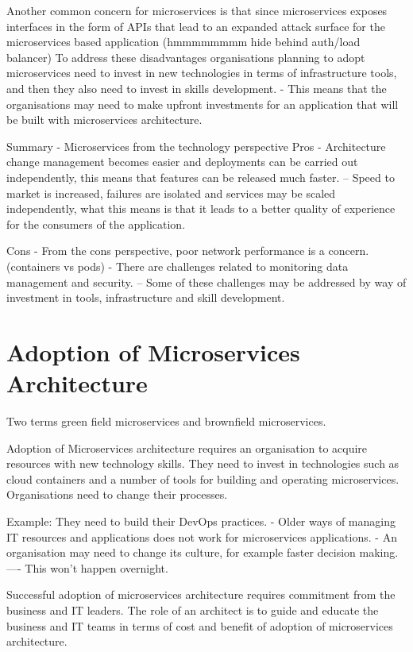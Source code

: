 \documentclass[a4paper, 11pt]{book}
\begin{document}
    Another common concern for microservices is that since microservices exposes interfaces in the form of APIs that lead to an expanded attack surface for the microservices based application (hmmmmmmmm hide behind auth/load balancer)
    To address these disadvantages organisations planning to adopt microservices need to invest in new technologies in terms of infrastructure tools, and then they also need to invest in skills development.
    - This means that the organisations may need to make upfront investments for an application that will be built with microservices architecture.


    Summary - Microservices from the technology perspective
    Pros
    - Architecture change management becomes easier and deployments can be carried out independently, this means that features can be released much faster.
    -- Speed to market is increased, failures are isolated and services may be scaled independently, what this means is that it leads to a better quality of experience for the consumers of the application.

    Cons
    - From the cons perspective, poor network performance is a concern. (containers vs pods)
    - There are challenges related to monitoring data management and security.
    -- Some of these challenges may be addressed by way of investment in tools, infrastructure and skill development.


    \section{Adoption of Microservices Architecture}

    Two terms green field microservices and brownfield microservices.

    Adoption of Microservices architecture requires an organisation to acquire resources with new technology skills.
    They need to invest in technologies such as cloud containers and a number of tools for building and operating microservices.
    Organisations need to change their processes.

    Example: They need to build their DevOps practices.
    - Older ways of managing IT resources and applications does not work for microservices applications.
    - An organisation may need to change its culture, for example faster decision making.
    ---- This won't happen overnight.

    Successful adoption of microservices architecture requires commitment from the business and IT leaders.
    The role of an architect is to guide and educate the business and IT teams in terms of cost and benefit of adoption of microservices architecture.
\end{document}
